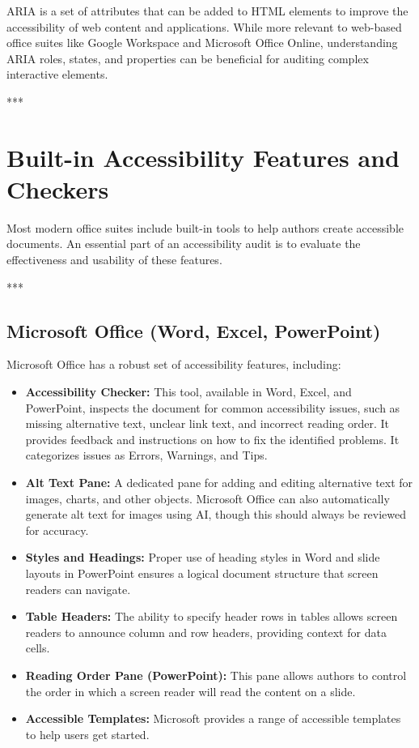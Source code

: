 \gls{ARIA} is a set of attributes that can be added to HTML elements to improve the accessibility of web content and applications. While more relevant to web-based office suites like Google Workspace and Microsoft Office Online, understanding \gls{ARIA} roles, states, and properties can be beneficial for auditing complex interactive elements\supercite{w3caria}.

***

\section{Built-in Accessibility Features and Checkers}
\label{sec:built-in-accessibility-features-and-checkers}

Most modern office suites include built-in tools to help authors create accessible documents. An essential part of an accessibility audit is to evaluate the effectiveness and usability of these features.

***

\subsection{Microsoft Office (Word, Excel, PowerPoint)}
\label{sub:microsoft-office-word-excel-powerpoint}

Microsoft Office has a robust set of accessibility features, including\supercite{MicrosoftAccessibility}:
\begin{itemize}
	\item \textbf{Accessibility Checker:} This tool, available in Word, Excel, and PowerPoint, inspects the document for common accessibility issues, such as missing alternative text, unclear link text, and incorrect reading order. It provides feedback and instructions on how to fix the identified problems. It categorizes issues as Errors, Warnings, and Tips.
	\item \textbf{Alt Text Pane:} A dedicated pane for adding and editing alternative text for images, charts, and other objects. Microsoft Office can also automatically generate alt text for images using AI, though this should always be reviewed for accuracy.
	\item \textbf{Styles and Headings:} Proper use of heading styles in Word and slide layouts in PowerPoint ensures a logical document structure that screen readers can navigate.
	\item \textbf{Table Headers:} The ability to specify header rows in tables allows screen readers to announce column and row headers, providing context for data cells.
	\item \textbf{Reading Order Pane (PowerPoint):} This pane allows authors to control the order in which a screen reader will read the content on a slide.
	\item \textbf{Accessible Templates:} Microsoft provides a range of accessible templates to help users get started.
\end{itemize}

